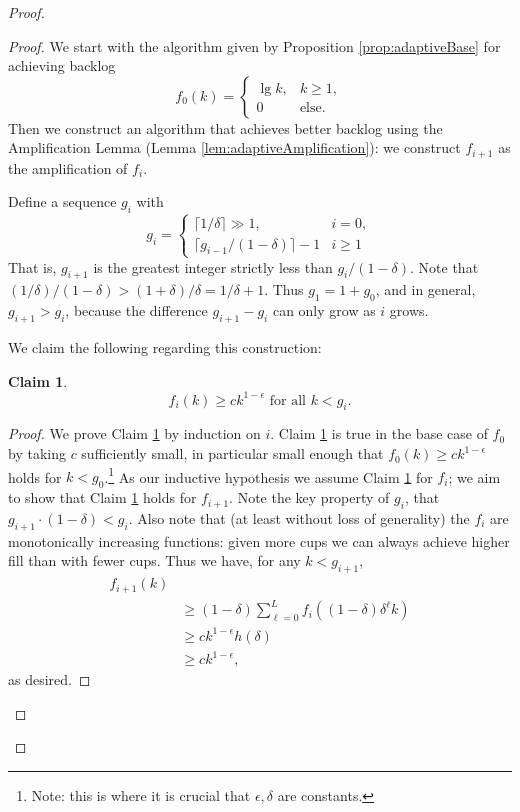 \documentclass[twocolumn]{article}[10pt]
\newtheorem{clm}{Claim}
\begin{document}
\begin{proof}
\begin{proof}
  We start with the algorithm given by Proposition \ref{prop:adaptiveBase} for achieving backlog
  $$f_0(k) = 
  \begin{cases} 
    \lg k, & k\geq 1, \\
    0 & \text{else.}
  \end{cases}$$
  Then we construct an algorithm that achieves better backlog using the
  Amplification Lemma (Lemma \ref{lem:adaptiveAmplification}):
  we construct $f_{i+1}$ as the amplification of $f_{i}$. 

  Define a sequence $g_i$ with 
  $$ g_i = \begin{cases}
    \lceil 1/\delta \rceil \gg 1,  & i = 0,\\
    \lceil g_{i-1}/(1-\delta)\rceil -1 & i  \ge 1
  \end{cases} $$
  That is, $g_{i+1}$ is the greatest integer strictly less than $g_i/(1-\delta)$.
  Note that $ (1/\delta) / (1-\delta) > (1+\delta)/\delta = 1/\delta + 1.$
  Thus $g_1 = 1+ g_0$, and in general, $g_{i+1} > g_i$, because the difference
  $g_{i+1}-g_i$ can only grow as $i$ grows.

  We claim the following regarding this construction:
  \begin{clm}
    \label{clm:fikinduction}
  \begin{equation}
    f_i(k) \ge ck^{1-\epsilon} \text{ for all } k < g_i. 
  \end{equation}
  \end{clm}
  \begin{proof}
  We prove Claim \ref{clm:fikinduction} by induction on $i$.
  Claim \ref{clm:fikinduction} is true in the base case of $f_0$ by taking $c$
  sufficiently small, in particular small enough that $f_0(k) \ge
  ck^{1-\epsilon}$ holds for $k < g_0$.\footnote{Note: this is where it is
    crucial that $\epsilon, \delta$ are constants.}
  As our inductive hypothesis we assume Claim \ref{clm:fikinduction} for $f_i$;
  we aim to show that Claim \ref{clm:fikinduction} holds for $f_{i+1}$. Note
  the key property of $g_i$, that $g_{i+1}\cdot(1-\delta) < g_i$. Also note
  that (at least without loss of generality) the $f_i$ are monotonically increasing
  functions: given more cups we can always achieve higher fill than with fewer
  cups. Thus we have, for any $k<g_{i+1}$,
  \begin{align*}
    f_{i+1}(k) &\\
    &\ge (1-\delta)\sum_{\ell=0}^L f_i((1-\delta)\delta^\ell k)\\
    &\ge ck^{1-\epsilon}h(\delta)\\
    &\ge ck^{1-\epsilon},
  \end{align*}
  as desired. 
  \end{proof}


\end{proof}
\end{proof}
\end{document}
